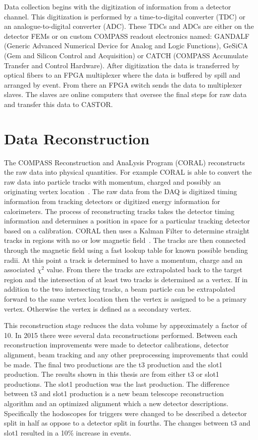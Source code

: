 Data collection begins with the digitization of information from a detector
channel.  This digitization is performed by a time-to-digital converter (TDC) or
an analogue-to-digital converter (ADC). These TDCs and ADCs are either on the
detector FEMs or on custom COMPASS readout electronics named: GANDALF (Generic
Advanced Numerical Device for Analog and Logic Functions), GeSiCA (Gem and
Silicon Control and Acquisition) or CATCH (COMPASS Accumulate Transfer and
Control Hardware).  After digitization the data is transferred by optical fibers
to an FPGA multiplexer where the data is buffered by spill and arranged by
event.  From there an FPGA switch sends the data to multiplexer slaves.  The
slaves are online computers that oversee the final steps for raw data and
transfer this data to CASTOR.  

\section{Data Reconstruction}\label{sec::dataReconstruction}
The COMPASS Reconstruction and AnaLysis Program (CORAL) reconstructs the raw
data into physical quantities.  For example CORAL is able to convert the raw
data into particle tracks with momentum, charged and possibly an originating
vertex location~\cite{CORAL}.  The raw data from the DAQ is digitized timing
information from tracking detectors or digitized energy information for
calorimeters.  The process of reconstructing tracks takes the detector timing
information and determines a position in space for a particular tracking
detector based on a calibration.  CORAL then uses a Kalman Filter to determine
straight tracks in regions with no or low magnetic field~\cite{KalmanFilter}.
The tracks are then connected through the magnetic field using a fast lookup
table for known possible bending radii.  At this point a track is determined to
have a momentum, charge and an associated $\chi^2$ value.  From there the tracks
are extrapolated back to the target region and the intersection of at least two
tracks is determined as a vertex.  If in addition to the two intersecting
tracks, a beam particle can be extrapolated forward to the same vertex location
then the vertex is assigned to be a primary vertex.  Otherwise the vertex is
defined as a secondary vertex.

This reconstruction stage reduces the data volume by approximately a factor of
10.  In 2015 there were several data reconstructions performed.  Between each
reconstruction improvements were made to detector calibrations, detector
alignment, beam tracking and any other preprocessing improvements that could be
made.  The final two productions are the t3 production and the slot1 production.
The results shown in this thesis are from either t3 or slot1 productions.  The
slot1 production was the last production.  The difference between t3 and slot1
production is a new beam telescope reconstruction algorithm and an optimized
alignment which a new detector descriptions.  Specifically the hodoscopes for
triggers were changed to be described a detector split in half as oppose to a
detector split in fourths.  The changes between t3 and slot1 resulted in a 10\%
increase in events.

